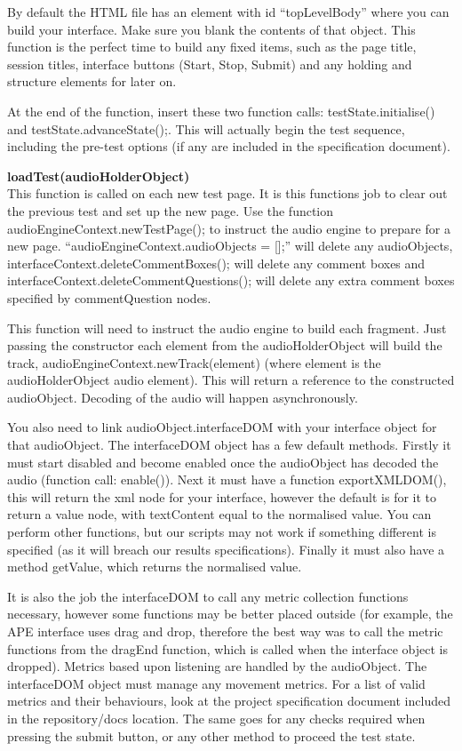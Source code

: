 \documentclass[11pt, oneside]{article}   	%
\begin{document}
				By default the HTML file has an element with id ``topLevelBody'' where you can build your interface. Make sure you blank the contents of that object. This function is the perfect time to build any fixed items, such as the page title, session titles, interface buttons (Start, Stop, Submit) and any holding and structure elements for later on.

				At the end of the function, insert these two function calls: testState.initialise() and testState.advanceState();. This will actually begin the test sequence, including the pre-test options (if any are included in the specification document).

			\textbf{loadTest(audioHolderObject)}\\
				This function is called on each new test page. It is this functions job to clear out the previous test and set up the new page. Use the function audioEngineContext.newTestPage(); to instruct the audio engine to prepare for a new page. ``audioEngineContext.audioObjects = [];'' will delete any audioObjects, interfaceContext.deleteCommentBoxes(); will delete any comment boxes and interfaceContext.deleteCommentQuestions(); will delete any extra comment boxes specified by commentQuestion nodes.

				This function will need to instruct the audio engine to build each fragment. Just passing the constructor each element from the audioHolderObject will build the track, audioEngineContext.newTrack(element) (where element is the audioHolderObject audio element). This will return a reference to the constructed audioObject. Decoding of the audio will happen asynchronously.

				You also need to link audioObject.interfaceDOM with your interface object for that audioObject. The interfaceDOM object has a few default methods. Firstly it must start disabled and become enabled once the audioObject has decoded the audio (function call: enable()). Next it must have a function exportXMLDOM(), this will return the xml node for your interface, however the default is for it to return a value node, with textContent equal to the normalised value. You can perform other functions, but our scripts may not work if something different is specified (as it will breach our results specifications). Finally it must also have a method getValue, which returns the normalised value.

				It is also the job the interfaceDOM to call any metric collection functions necessary, however some functions may be better placed outside (for example, the APE interface uses drag and drop, therefore the best way was to call the metric functions from the dragEnd function, which is called when the interface object is dropped). Metrics based upon listening are handled by the audioObject. The interfaceDOM object must manage any movement metrics. For a list of valid metrics and their behaviours, look at the project specification document included in the repository/docs location. The same goes for any checks required when pressing the submit button, or any other method to proceed the test state.
\end{document}
